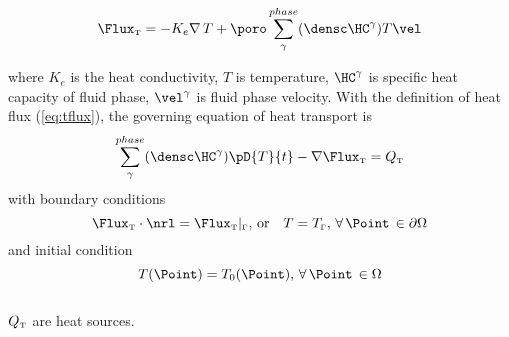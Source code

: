 \begin{equation}
 \Flux_{\mbox{\tiny T}} = -K_e\nabla\,T+\poro\sum_{\gamma}^{phase}(\densc\HC^{\gamma}) T\vel
 \label{eq:tflux}
\end{equation}

where $K_e$ is the heat conductivity, $T$ is temperature,
$\HC^{\gamma}$ is specific heat capacity of fluid phase,
$\vel^\gamma$ is fluid phase velocity.
%
With the definition of heat flux (\ref{eq:tflux}), the governing
equation of heat transport is
\begin{equation}
 \sum_{\gamma}^{phase}(\densc\HC^{\gamma})\pD{T}{t}-\nabla \Flux_{\mbox{\tiny T}}
 =
 Q_{\mbox{\tiny T}}
 \label{eq:tgrn}
\end{equation}
with boundary conditions
\begin{equation}
 \Flux_{\mbox{\tiny T}}\cdot\nrl=\Flux_{\mbox{\tiny
 T}}\vert_{\scriptscriptstyle{\Gamma}},\, \mbox{or}\quad
 T=T_{\scriptscriptstyle{\Gamma}}, \,
 \forall\, \Point\, \in \partial \Omega
 \label{eq:tbc}
\end{equation}
and initial condition
\begin{equation}
 T(\Point)=T_0(\Point), \, \forall\, \Point\, \in \Omega
 \label{eq:tini}
\end{equation}
\\[3mm]
$ Q_{\mbox{\tiny T}}$ are heat sources.
